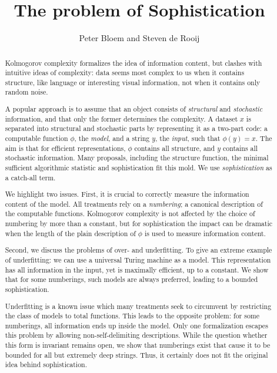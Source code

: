 \documentclass{style/llncs}
\title{The problem of Sophistication}
\author{Peter Bloem and Steven de Rooij}
\institute{
  System and Network Engineering Group, \\University of Amsterdam, the Netherlands\\
  \email{uva@peterbloem.nl, steven.de.rooij@gmail.com}
}
\begin{document}
 
\maketitle

\begin{abstract}
Kolmogorov complexity formalizes the idea of information content, but clashes with intuitive ideas of complexity: data seems most complex to us when it contains structure, like language or interesting visual information, not when it contains only random noise.

\hspace{0.05\textwidth}A popular approach is to assume that an object consists of \emph{structural} and \emph{stochastic} information, and that only the former determines the complexity. A dataset $x$ is separated into structural and stochastic parts by representing it as a two-part code: a computable function $\phi$, the \emph{model}, and a string $y$, the \emph{input}, such that $\phi(y) = x$. The aim is that for efficient representations, $\phi$ contains all structure, and $y$ contains all stochastic information. Many proposals, including the structure function, the minimal sufficient algorithmic statistic and sophistication fit this mold. We use \emph{sophistication} as a catch-all term. 

\hspace{0.05\textwidth} We highlight two issues. First, it is crucial to correctly measure the information content of the model. All treatments rely on a \emph{numbering}; a canonical description of the computable functions. Kolmogorov complexity is not affected by the choice of numbering by more than a constant, but for sophistication the impact can be dramatic when the length of the plain description of $\phi$ is used to measure information content.

\hspace{0.05\textwidth} Second, we discuss the problems of over- and underfitting. To give an extreme example of underfitting: we can use a universal Turing machine as a model. This representation has all information in the input, yet is maximally efficient, up to a constant. We show that for some numberings, such models are always preferred, leading to a bounded sophistication. 

\hspace{0.05\textwidth} Underfitting is a known issue which many treatments seek to circumvent by restricting the class of models to total functions. This leads to the opposite problem: for some numberings, all information ends up inside the model. Only one formalization escapes this problem by allowing non-self-delimiting descriptions. While the question whether this form is invariant remains open, we show that numberings exist that cause it to be bounded for all but extremely deep strings. Thus, it certainly does not fit the original idea behind sophistication.


\end{abstract}
\end{document}
